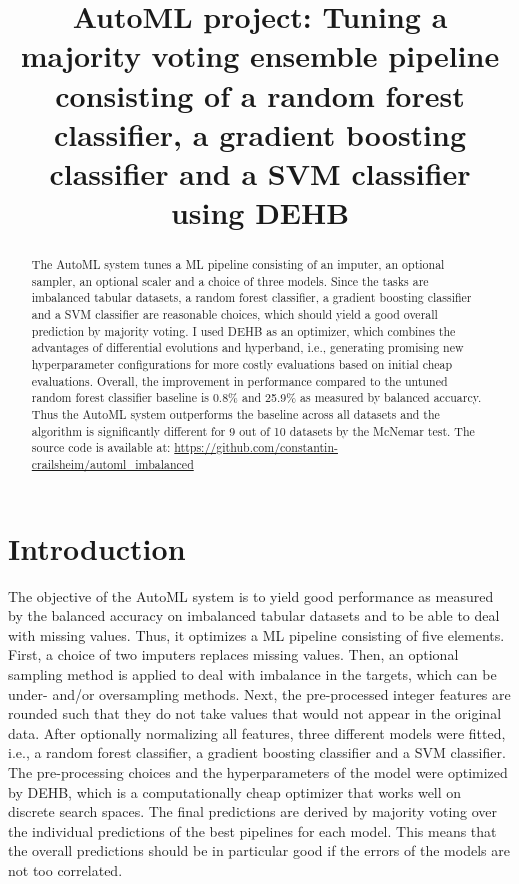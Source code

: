 \documentclass[11pt]{article}
\title{AutoML project: Tuning a majority voting ensemble pipeline consisting of a random forest classifier, a gradient boosting classifier and a SVM classifier using DEHB}
\author[1]{\nameemail{Constantin von Crailsheim}{C.Crailsheim@campus.lmu.de}}
\affil[1]{LMU Munich, Institute of Statistics}
\begin{document}
\maketitle

\begin{abstract}
The AutoML system tunes a ML pipeline consisting of an imputer, an optional sampler, an optional scaler and a choice of three models. Since the tasks are imbalanced tabular datasets, a random forest classifier, a gradient boosting classifier and a SVM classifier are reasonable choices, which should yield a good overall prediction by majority voting. I used DEHB as an optimizer, which combines the advantages of differential evolutions and hyperband, i.e., generating promising new hyperparameter configurations for more costly evaluations based on initial cheap evaluations. Overall, the improvement in performance compared to the untuned random forest classifier baseline is 0.8\% and 25.9\% as measured by balanced accuarcy. Thus the AutoML system outperforms the baseline across all datasets and the algorithm is significantly different for 9 out of 10 datasets by the McNemar test. The source code is available at: \url{https://github.com/constantin-crailsheim/automl_imbalanced}
\end{abstract}



\section{Introduction}

The objective of the AutoML system is to yield good performance as measured by the balanced accuracy on imbalanced tabular datasets and to be able to deal with missing values. Thus, it optimizes a ML pipeline consisting of five elements. First, a choice of two imputers replaces missing values. Then, an optional sampling method is applied to deal with imbalance in the targets, which can be under- and/or oversampling methods. Next, the pre-processed integer features are rounded such that they do not take values that would not appear in the original data. After optionally normalizing all features, three different models were fitted, i.e., a random forest classifier, a gradient boosting classifier and a SVM classifier. The pre-processing choices and the hyperparameters of the model were optimized by DEHB, which is a computationally cheap optimizer that works well on discrete search spaces. The final predictions are derived by majority voting over the individual predictions of the best pipelines for each model. This means that the overall predictions should be in particular good if the errors of the models are not too correlated.
\end{document}
